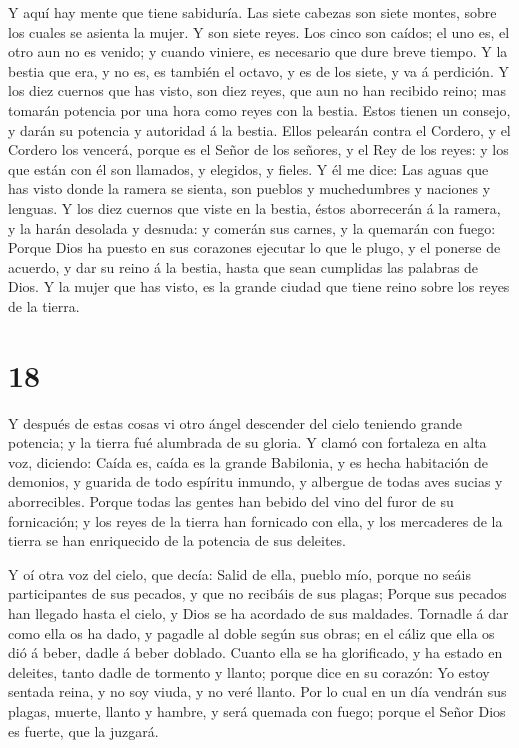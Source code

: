  Y aquí hay mente que tiene sabiduría. Las siete cabezas son
siete montes, sobre los cuales se asienta la mujer.  Y son
siete reyes. Los cinco son caídos; el uno es, el otro aun no es venido;
y cuando viniere, es necesario que dure breve tiempo.  Y la
bestia que era, y no es, es también el octavo, y es de los siete, y va á
perdición.  Y los diez cuernos que has visto, son diez
reyes, que aun no han recibido reino; mas tomarán potencia por una hora
como reyes con la bestia.  Estos tienen un consejo, y darán
su potencia y autoridad á la bestia.  Ellos pelearán contra
el Cordero, y el Cordero los vencerá, porque es el Señor de los señores,
y el Rey de los reyes: y los que están con él son llamados, y elegidos,
y fieles.  Y él me dice: Las aguas que has visto donde la
ramera se sienta, son pueblos y muchedumbres y naciones y lenguas.
 Y los diez cuernos que viste en la bestia, éstos
aborrecerán á la ramera, y la harán desolada y desnuda: y comerán sus
carnes, y la quemarán con fuego:  Porque Dios ha puesto en
sus corazones ejecutar lo que le plugo, y el ponerse de acuerdo, y dar
su reino á la bestia, hasta que sean cumplidas las palabras de Dios.
 Y la mujer que has visto, es la grande ciudad que tiene
reino sobre los reyes de la tierra.

\hypertarget{section-17}{%
\section{18}\label{section-17}}

 Y después de estas cosas vi otro ángel descender del cielo
teniendo grande potencia; y la tierra fué alumbrada de su gloria.
 Y clamó con fortaleza en alta voz, diciendo: Caída es,
caída es la grande Babilonia, y es hecha habitación de demonios, y
guarida de todo espíritu inmundo, y albergue de todas aves sucias y
aborrecibles.  Porque todas las gentes han bebido del vino
del furor de su fornicación; y los reyes de la tierra han fornicado con
ella, y los mercaderes de la tierra se han enriquecido de la potencia de
sus deleites.

 Y oí otra voz del cielo, que decía: Salid de ella, pueblo
mío, porque no seáis participantes de sus pecados, y que no recibáis de
sus plagas;  Porque sus pecados han llegado hasta el cielo,
y Dios se ha acordado de sus maldades.  Tornadle á dar como
ella os ha dado, y pagadle al doble según sus obras; en el cáliz que
ella os dió á beber, dadle á beber doblado.  Cuanto ella se
ha glorificado, y ha estado en deleites, tanto dadle de tormento y
llanto; porque dice en su corazón: Yo estoy sentada reina, y no soy
viuda, y no veré llanto.  Por lo cual en un día vendrán sus
plagas, muerte, llanto y hambre, y será quemada con fuego; porque el
Señor Dios es fuerte, que la juzgará.

